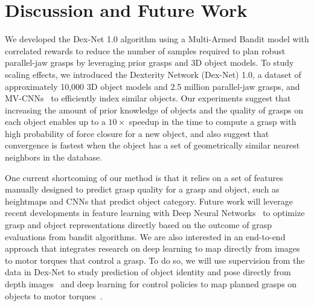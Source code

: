 \section{Discussion and Future Work}
We developed the Dex-Net 1.0 algorithm using a Multi-Armed Bandit model with correlated rewards to reduce the number of samples required to plan robust parallel-jaw grasps by leveraging prior grasps and 3D object models.
To study scaling effects, we introduced the Dexterity Network (Dex-Net) 1.0, a dataset of approximately 10,000 3D object models and 2.5 million parallel-jaw grasps, and MV-CNNs~\cite{aubry2015understanding, su2015multi} to efficiently index similar objects.
Our experiments suggest that increasing the amount of prior knowledge of objects and the quality of grasps on each object enables up to a $10\times$ speedup in the time to compute a grasp with high probability of force closure for a new object, and also suggest that convergence is fastest when the object has a set of geometrically similar nearest neighbors in the database.

One current shortcoming of our method is that it relies on a set of features manually designed to predict grasp quality for a grasp and object, such as heightmaps and CNNs that predict object category.
Future work will leverage recent developments in feature learning with Deep Neural Networks~\cite{krizhevsky2012imagenet} to optimize grasp and object representations directly based on the outcome of grasp evaluations from bandit algorithms.
We are also interested in an end-to-end approach that integrates research on deep learning to map directly from images to motor torques that control a grasp.
To do so, we will use supervision from the data in Dex-Net to study prediction of object identity and pose directly from depth images~\cite{aubry2015understanding} and deep learning for control policies to map planned grasps on objects to motor torques~\cite{levine2015end}. 


